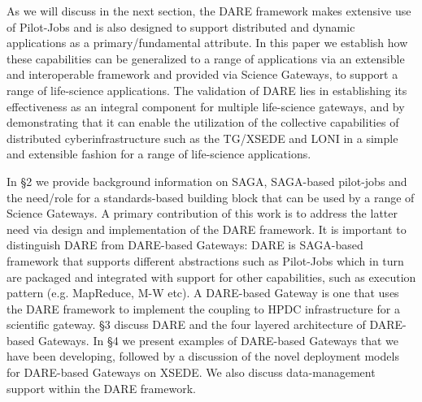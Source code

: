 \documentclass[]{svjour3}
\begin{document}
As we will discuss in the next section, the DARE framework makes
extensive use of Pilot-Jobs and is also designed to support
distributed and dynamic applications as a primary/fundamental
attribute.  In this paper we establish how these capabilities can be
generalized to a range of applications via an extensible and
interoperable framework and provided via Science Gateways, to support
a range of life-science applications.  The validation of DARE lies in
establishing its effectiveness as an integral component for multiple
life-science gateways, and by demonstrating that it can enable the
utilization of the collective capabilities of distributed
cyberinfrastructure such as the TG/XSEDE and LONI in a simple and
extensible fashion for a range of life-science applications.

In \S2 we provide background information on SAGA, SAGA-based
pilot-jobs and the need/role for a standards-based building block that
can be used by a range of Science Gateways.  A primary contribution of
this work is to address the latter need via design and implementation
of the DARE framework.  It is important to distinguish DARE from
DARE-based Gateways: DARE is SAGA-based framework that supports
different abstractions such as Pilot-Jobs which in turn are packaged
and integrated with support for other capabilities, such as execution
pattern (e.g. MapReduce, M-W etc). A DARE-based Gateway is one that
uses the DARE framework to implement the coupling to HPDC
infrastructure for a scientific gateway.  \S3 discuss DARE and the
four layered architecture of DARE-based Gateways. In \S4 we present
examples of DARE-based Gateways that we have been developing, followed
by a discussion of the novel deployment models for DARE-based Gateways
on XSEDE. We also discuss data-management support within the DARE
framework.


\end{document}
